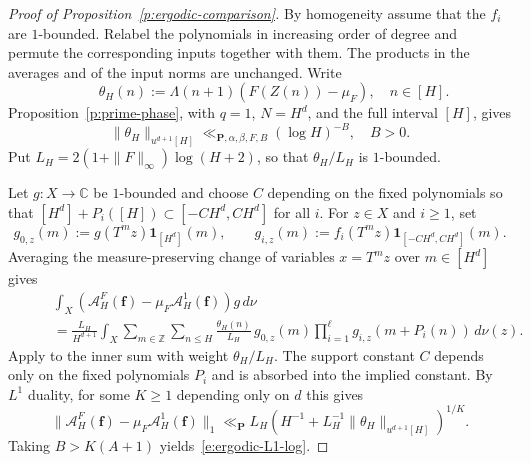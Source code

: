 \documentclass[12pt]{amsart}
\newcommand{\1}{\mathbf 1}
\theoremstyle{definition}
\begin{document}
\begin{proof}[Proof of Proposition~\ref{p:ergodic-comparison}]
By homogeneity assume that the \(f_i\) are \(1\)-bounded. Relabel
the polynomials in increasing order of degree and permute the
corresponding inputs together with them. The products in the
averages and of the input norms are unchanged. Write
$$  \qquad \theta_H(n):=\Lambda(n+1)(F(Z(n))-\mu_F), \quad n\in [H].$$
Proposition~\ref{p:prime-phase}, with \(q=1\), \(N=H^d\), and
the full interval \([H]\), gives
\[\|\theta_H\|_{u^{d+1}[H]}\ll_{\mathbf P,\alpha,\beta,F,B}(\log H)^{-B}, \quad B>0.\] 
Put
\(L_H=2(1+\|F\|_\infty)\log(H+2)\), so that \(\theta_H/L_H\)
is \(1\)-bounded.

Let \(g:X\to\mathbb C\) be \(1\)-bounded and choose \(C\) depending
on the fixed polynomials so that \([H^d]+P_i([H])\subset[-CH^d,CH^d]\)
for all \(i\). For \(z\in X\) and \(i\ge1\), set
\[g_{0,z}(m):=g(T^m z)\mathbf1_{[H^d]}(m),\qquad g_{i,z}(m):=f_i(T^m z)\mathbf1_{[-CH^d,CH^d]}(m).\] 
Averaging the measure-preserving change of variables \(x=T^m z\) over \(m\in[H^d]\) gives
\begin{align*}
 &\int_X (\mathcal A_H^F(\mathbf f)-\mu_F\mathcal A_H^1(\mathbf f))g\,d\nu\\
 \qquad &=\frac{L_H}{H^{d+1}}\int_X
    \sum_{m\in\mathbb Z}\sum_{n\le H}
       \frac{\theta_H(n)}{L_H}\,
       g_{0,z}(m)\prod_{i=1}^{\ell}g_{i,z}(m+P_i(n))\,d\nu(z).
\end{align*}
Apply \cite[Theorem~4.1]{Teravainen} to the inner sum with weight
$\theta_H/L_H$. The support constant $C$ depends only on the
fixed polynomials $P_i$ and is absorbed into the implied constant.
 By \(L^1\) duality, for some \(K\ge1\) depending
only on \(d\) this gives
\[
 \|\mathcal A_H^F(\mathbf f)-\mu_F\mathcal A_H^1(\mathbf f)\|_1\ll_{\mathbf P}
 L_H\left(H^{-1}+L_H^{-1}\|\theta_H\|_{u^{d+1}[H]}\right)^{1/K}.
\]
Taking \(B>K(A+1)\) yields~\eqref{e:ergodic-L1-log}.


\end{proof}
\end{document}
